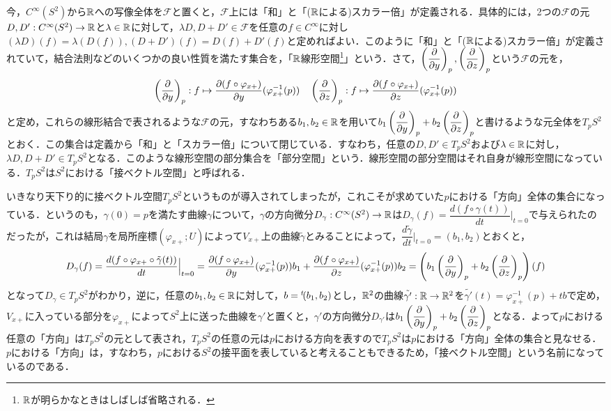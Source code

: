 今，$C^{\infty}(S^2)$から${\mathbb R}$への写像全体を$\mathcal F$と置くと，$\mathcal F$上には「和」と「(${\mathbb R}$による)スカラー倍」が定義される．具体的には，2つの${\mathcal F}$の元$D,D':C^{\infty}(S^2)\rightarrow {\mathbb R}$と$\lambda\in{\mathbb R}$に対して，$\lambda D,D+D'\in{\mathcal F}$を任意の$f\in C^{\infty}$に対し$(\lambda D)(f)=\lambda(D(f)),(D+D')(f)=D(f)+D'(f)$と定めればよい．このように「和」と「(${\mathbb R}$による)スカラー倍」が定義されていて，結合法則などのいくつかの良い性質を満たす集合を，「${\mathbb R}$線形空間\footnote{${\mathbb R}$が明らかなときはしばしば省略される．}」という．さて，$\left(\dfrac{\partial}{\partial y}\right)_p,\left(\dfrac{\partial}{\partial z}\right)_p$という$\mathcal F$の元を，
$$
\left(\dfrac{\partial}{\partial y}\right)_p:f\mapsto \dfrac{\partial (f\circ\varphi_{x+})}{\partial y}(\varphi_{x+}^{-1}(p))\quad
\left(\dfrac{\partial}{\partial z}\right)_p:f\mapsto \dfrac{\partial (f\circ\varphi_{x+})}{\partial z}(\varphi_{x+}^{-1}(p))
$$
と定め，これらの線形結合で表されるような$\mathcal F$の元，すなわちある$b_1,b_2\in{\mathbb R}$を用いて$b_1\left(\dfrac{\partial}{\partial y}\right)_p+b_2\left(\dfrac{\partial}{\partial z}\right)_p$と書けるような元全体を$T_pS^2$とおく．この集合は定義から「和」と「スカラー倍」について閉じている．すなわち，任意の$D,D'\in T_pS^2$および$\lambda\in{\mathbb R}$に対し，$\lambda D,D+D'\in T_pS^2$となる．このような線形空間の部分集合を「部分空間」という．線形空間の部分空間はそれ自身が線形空間になっている．$T_pS^2$は$S^2$における「接ベクトル空間」と呼ばれる．


いきなり天下り的に接ベクトル空間$T_pS^2$というものが導入されてしまったが，これこそが求めていた$p$における「方向」全体の集合になっている．というのも，$\gamma(0)=p$を満たす曲線$\gamma$について，$\gamma$の方向微分$D_\gamma:C^{\infty}(S^2)\rightarrow{\mathbb R}$は$D_\gamma(f)=\dfrac{d(f\circ\gamma(t))}{dt}\Big|_{t=0}$で与えられたのだったが，これは結局$\gamma$を局所座標$(\varphi_{x+};U)$によって$V_{x+}$上の曲線$\tilde{\gamma}$とみることによって，$\dfrac{d\tilde{\gamma}}{dt}\Big|_{t=0}=(b_1,b_2)$とおくと，
$$D_\gamma(f)=\dfrac{d(f\circ\varphi_{x+}\circ\tilde{\gamma}(t))}{dt}\Big|_{t=0}=\dfrac{\partial (f\circ\varphi_{x+})}{\partial y}(\varphi_{x+}^{-1}(p))b_1+\dfrac{\partial (f\circ\varphi_{x+})}{\partial z}(\varphi_{x+}^{-1}(p))b_2=\left(b_1\left(\dfrac{\partial}{\partial y}\right)_p+b_2\left(\dfrac{\partial}{\partial z}\right)_p\right)(f)
$$
となって$D_{\gamma}\in T_pS^2$がわかり，逆に，任意の$b_1,b_2\in{\mathbb R}$に対して，$b={}^t\!(b_1,b_2)$とし，${\mathbb R}^2$の曲線$\tilde{\gamma'}:{\mathbb R}\rightarrow{\mathbb R}^2$を$\tilde{\gamma'}(t)=\varphi_{x+}^{-1}(p)+tb$で定め，$V_{x+}$に入っている部分を$\varphi_{x+}$によって$S^2$上に送った曲線を$\gamma'$と置くと，$\gamma'$の方向微分$D_{\gamma'}$は$b_1\left(\dfrac{\partial}{\partial y}\right)_p+b_2\left(\dfrac{\partial}{\partial z}\right)_p$となる．よって$p$における任意の「方向」は$T_pS^2$の元として表され，$T_pS^2$の任意の元は$p$における方向を表すので$T_pS^2$は$p$における「方向」全体の集合と見なせる．$p$における「方向」は，すなわち，$p$における$S^2$の接平面を表していると考えることもできるため，「接ベクトル空間」という名前になっているのである．



